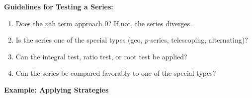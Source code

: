 \documentclass[addpoints, 12pt]{exam}
\begin{document}
\textbf{Guidelines for Testing a Series:}
\begin{enumerate}
    \item Does the $n$th term approach 0? If not, the series diverges.
    \item Is the series one of the special types (geo, $p$-series, telescoping, alternating)?
    \item Can the integral test, ratio test, or root test be applied?
    \item Can the series be compared favorably to one of the special types?
\end{enumerate}
\vspace{.1}
\noindent\textbf{Example: Applying Strategies}
\end{document}
